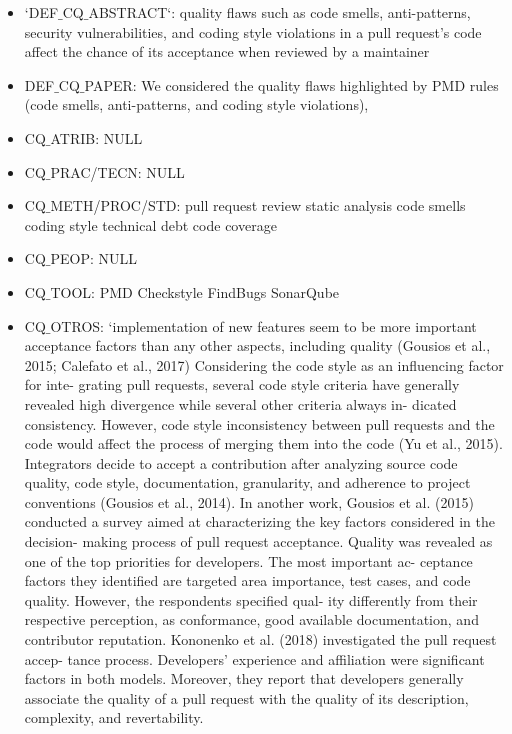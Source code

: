 \documentclass[conference]{IEEEtran}
\begin{document}
\begin{itemize}
\item `DEF$\_$CQ$\_$ABSTRACT`: quality flaws such as code smells, anti-patterns, security
vulnerabilities, and coding style violations in a pull request’s code affect the chance of its acceptance
when reviewed by a maintainer
\item DEF$\_$CQ$\_$PAPER: 
We considered the quality flaws highlighted by PMD rules (code smells, anti-patterns, and coding style violations),
\item CQ$\_$ATRIB: NULL
\item CQ$\_$PRAC/TECN: NULL
\item CQ$\_$METH/PROC/STD: 
pull request
review
static analysis
code smells
coding style
technical debt
code coverage 
\item CQ$\_$PEOP: NULL
\item  CQ$\_$TOOL: PMD
Checkstyle
FindBugs
SonarQube
\item CQ$\_$OTROS:  `implementation of new features seem to be more important acceptance factors than any other aspects, including quality (Gousios et al., 2015; Calefato et al., 2017) Considering the code style as an influencing factor for inte- grating pull requests, several code style criteria have generally revealed high divergence while several other criteria always in- dicated consistency. However, code style inconsistency between pull requests and the code would affect the process of merging them into the code (Yu et al., 2015).  Integrators decide to accept a contribution after analyzing source code quality, code style, documentation, granularity, and adherence to project conventions (Gousios et al., 2014). 
In another work, Gousios et al. (2015) conducted a survey aimed at characterizing the key factors considered in the decision- making process of pull request acceptance. Quality was revealed as one of the top priorities for developers. The most important ac- ceptance factors they identified are targeted area importance, test cases, and code quality. However, the respondents specified qual- ity differently from their respective perception, as conformance, good available documentation, and contributor reputation.
Kononenko et al. (2018) investigated the pull request accep- tance process. Developers’ experience and affiliation were significant factors in both models. Moreover, they report that developers generally associate the quality of a pull request with the quality of its description, complexity, and revertability. 

\end{itemize}






\end{document}
